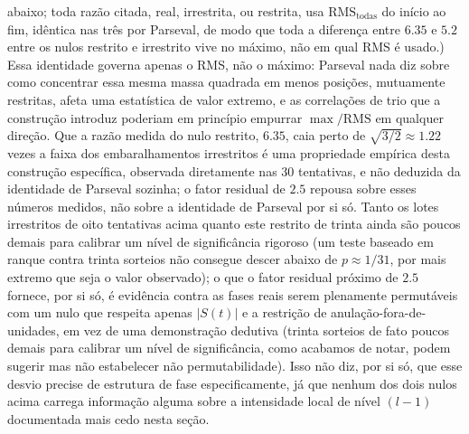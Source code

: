 \documentclass[11pt]{amsart}
\theoremstyle{plain}
\theoremstyle{definition}
\theoremstyle{remark}
\begin{document}
abaixo; toda razão citada, real, irrestrita, ou restrita, usa $\mathrm{RMS}_{\mathrm{todas}}$ do
início ao fim, idêntica nas três por Parseval, de modo que toda a diferença entre $6.35$ e $5.2$
entre os nulos restrito e irrestrito vive no máximo, não em qual RMS é usado.) Essa identidade
governa apenas o RMS, não o máximo: Parseval nada diz sobre como concentrar essa mesma massa
quadrada em menos posições, mutuamente restritas, afeta uma estatística de valor extremo, e as
correlações de trio que a construção introduz poderiam em princípio empurrar $\max/\mathrm{RMS}$ em
qualquer direção. Que a razão medida do nulo restrito, $6.35$, caia perto de $\sqrt{3/2}\approx1.22$
vezes a faixa dos embaralhamentos irrestritos é uma propriedade empírica desta construção
específica, observada diretamente nas 30 tentativas, e não deduzida da identidade de Parseval
sozinha; o fator residual de $2.5$ repousa sobre esses números medidos, não sobre a identidade de
Parseval por si só. Tanto os lotes irrestritos de oito tentativas acima quanto este restrito de
trinta ainda são poucos demais para calibrar um nível de significância rigoroso (um teste baseado
em ranque contra trinta sorteios não consegue descer abaixo de $p\approx1/31$, por mais extremo que
seja o valor observado); o que o fator residual próximo de $2.5$ fornece, por si só, é evidência
contra as fases reais serem plenamente permutáveis com um nulo que respeita apenas $|S(t)|$ e a
restrição de anulação-fora-de-unidades, em vez de uma demonstração dedutiva (trinta sorteios de
fato poucos demais para calibrar um nível de significância, como acabamos de notar, podem sugerir
mas não estabelecer não permutabilidade). Isso não diz, por si só, que esse desvio precise de
estrutura de fase especificamente, já que nenhum dos dois nulos acima carrega informação alguma
sobre a intensidade local de nível $(l-1)$ documentada mais cedo nesta seção.
\end{document}
